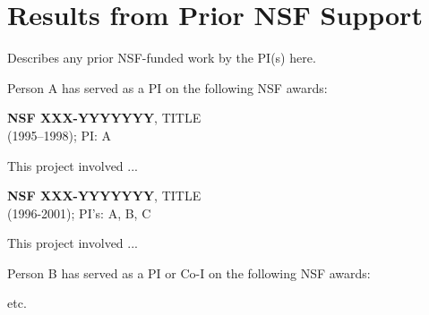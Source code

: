 \section{Results from Prior NSF Support}
\label{priornsf}
%
Describes any prior NSF-funded work by the PI(s) here.


\noindent
Person A has served as a PI on the following NSF awards:

\noindent
{\bf NSF XXX-YYYYYYY}, TITLE \\
(1995--1998); PI: A

This project involved ...


\noindent
{\bf NSF XXX-YYYYYYY}, TITLE \\
(1996-2001); PI's: A, B, C

This project involved ...

\noindent
Person B has served as a PI or Co-I on the following NSF awards:

etc.
